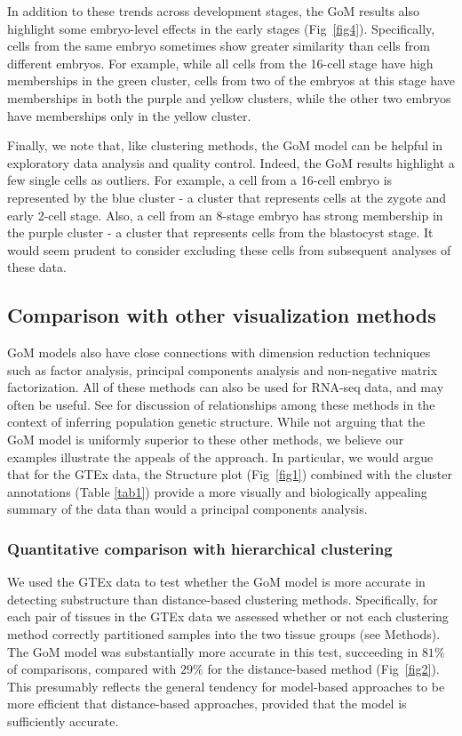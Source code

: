 \documentclass[10pt,letterpaper]{article}
\begin{document}
In addition to these trends across development stages, the GoM results also highlight some embryo-level effects in the early stages (Fig~\ref{fig4}). Specifically, cells from the same embryo sometimes show greater similarity than cells from different embryos.
For example, while all cells from the 16-cell stage have high memberships in the green cluster, cells from two of the embryos at this stage have memberships in both the purple and yellow clusters, while the other two embryos have memberships only in the yellow cluster.

Finally, we note that, like clustering methods, the GoM model can be helpful in exploratory data analysis and quality control. Indeed,
the GoM results highlight a few single cells as outliers. For example, a cell from a 16-cell embryo is represented by the blue cluster - a cluster that represents cells at the zygote and early 2-cell stage. Also, a cell from an 8-stage embryo has strong membership in the purple cluster - a cluster that represents cells from the blastocyst stage. It would seem prudent to consider excluding these cells from subsequent analyses of these data.


\subsection*{Comparison with other visualization methods}

GoM models also have close connections with dimension reduction techniques such as factor analysis, principal components analysis and non-negative matrix factorization. All of these methods can also be used for RNA-seq data, and may often be useful. See  \cite{Engelhardt2010} for discussion of
relationships among these methods in the context of inferring population genetic structure. While not arguing that the GoM model
is uniformly superior to these other methods, we believe our examples illustrate the appeals of the approach. In particular, we would argue that for the GTEx data, the Structure plot (Fig~\ref{fig1}) combined with the cluster annotations (Table \ref{tab1}) provide a more visually and biologically appealing summary of the data
than would a principal components analysis.

\subsubsection*{Quantitative comparison with hierarchical clustering}

We used the GTEx data to test whether the GoM model is more accurate in detecting substructure than distance-based clustering methods.
Specifically, for each pair of tissues in the GTEx data we assessed whether or not each clustering method
correctly partitioned samples into the two tissue groups (see Methods). The GoM model was substantially more accurate in this test, succeeding in $81 \%$ of comparisons, compared with $29 \%$ for the distance-based method (Fig~\ref{fig2}). This presumably reflects the general tendency for model-based
approaches to be more efficient that distance-based approaches, provided that the model is sufficiently accurate.
\end{document}
